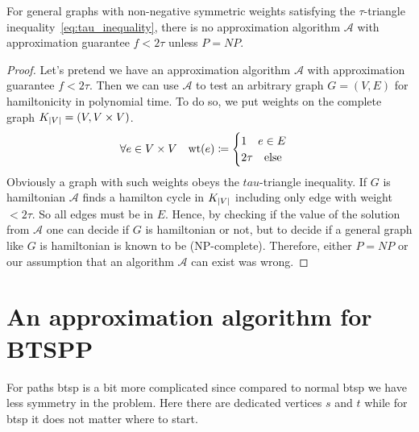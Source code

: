 \begin{theorem}
  For general graphs with non-negative symmetric weights satisfying the \(\tau\)-triangle inequality~\eqref{eq:tau_inequality}, there is no approximation algorithm \(\mathcal{A}\) with approximation guarantee \(f < 2\tau\) unless \(P = NP\).
\end{theorem}

\begin{proof}
  Let's pretend we have an approximation algorithm \(\mathcal{A}\) with approximation guarantee \(f < 2\tau\). Then we can use \(\mathcal{A}\) to test an arbitrary graph \(G = (V,E)\) for hamiltonicity in polynomial time. To do so, we put weights on the complete graph \(K_{\vert V \vert} = (V, V \times V)\).
  \begin{equation*}
    \forall e \in V \times V \quad \textrm{wt}(e) \coloneqq \begin{cases}
      1 \quad e \in E \\
      2 \tau \quad \text{else}
    \end{cases}
  \end{equation*}
  Obviously a graph with such weights obeys the \(tau\)-triangle inequality. If \(G\) is hamiltonian \(\mathcal{A}\) finds a hamilton cycle in \(K_{\vert V \vert}\) including only edge with weight \(< 2\tau\). So all edges must be in \(E\). Hence, by checking if the value of the solution from \(\mathcal{A}\) one can decide if \(G\) is hamiltonian or not, but to decide if a general graph like \(G\) is hamiltonian is known to be (NP-complete). Therefore, either \(P = NP\) or our assumption that an algorithm \(\mathcal{A}\) can exist was wrong.

\end{proof}

\section{An approximation algorithm for BTSPP}
For paths \gls{btsp} is a bit more complicated since compared to normal \gls{btsp} we have less symmetry in the problem. Here there are dedicated vertices \(s\) and \(t\) while for \gls{btsp} it does not matter where to start.


